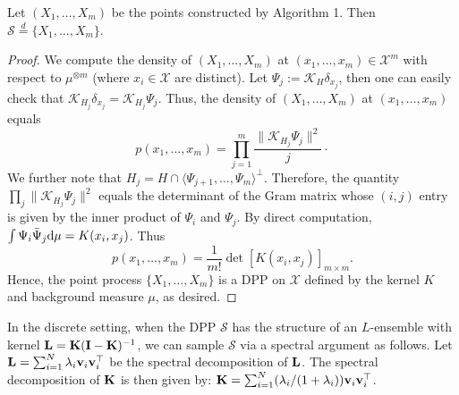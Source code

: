 \begin{proposition}
 Let $(X_1,\ldots,X_m)$ be the points constructed by Algorithm 1. Then $ \mathcal S \overset{d}{=}  \{X_1,\ldots,X_m\} $.
\end{proposition}

\begin{proof}
    We compute the density of $(X_1,\ldots,X_m)$ at $(x_1,\ldots,x_m) \in \mathcal X^m$ with respect to $\mu^{\otimes m}$ (where $x_i \in \mathcal X$ are  distinct). Let $\Psi_j:= \mathcal K_H \delta_{x_j}$, then one can easily check that $\mathcal K_{H_j}\delta_{x_j} = \mathcal K_{H_j}\Psi_j$. Thus, the density of $(X_1,\ldots,X_m)$ at $(x_1,\ldots,x_m)$ equals
    \[ p(x_1,\ldots,x_m) = \prod_{j=1}^m \frac{\|\mathcal K_{H_j}\Psi_j \|^2}{j} \cdot\]
    We further note that $H_j = H \cap \langle \Psi_{j+1},\ldots, \Psi_m \rangle^\perp$. Therefore, the quantity $\prod_j \|\mathcal K_{H_j} \Psi_j\|^2$ equals the determinant of the Gram matrix whose $(i,j)$ entry is given by the inner product of $\Psi_i$ and $\Psi_j$. By direct computation,
    $ \int \Psi_i \bar\Psi_j \mathrm{d} \mu = K(x_i,x_j)$.
    Thus
    \[ p(x_1,\ldots,x_m) = \frac{1}{m!} \det [K(x_i,x_j)]_{m\times m}.\]
    Hence, the point process $\{X_1,\ldots,X_m\}$ is a DPP on $\mathcal X$ defined by the kernel $K$ and background measure $\mu$, as desired.
\end{proof}

In the discrete setting, when the DPP $\mathcal S$ has the structure of an $L$-ensemble with kernel $\mathbf{L} = \mathbf{K}(\mathbf{I}-\mathbf{K})^{-1}$, we can sample $\mathcal S$ via a spectral argument as follows. 
Let $\mathbf{L}=\sum_{i =1}^N \lambda_i \mathbf{v}_i \mathbf{v}_i^\top$ be the spectral decomposition of $\mathbf{L}$. The spectral decomposition of $\mathbf{K}$ is then given by: $\mathbf{K}=\sum_{i =1}^N (\lambda_i/(1+\lambda_i)) \mathbf{v}_i \mathbf{v}_i^\top$.

